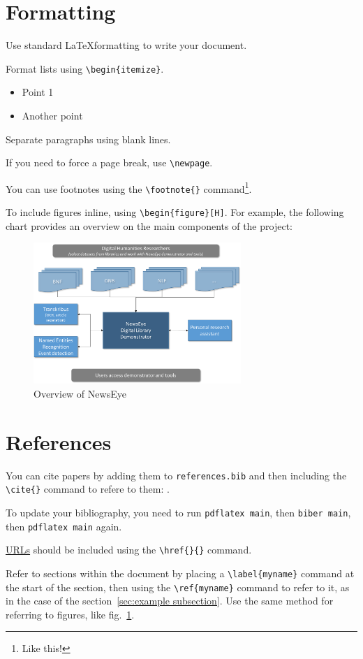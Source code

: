 \documentclass{newseye_del}
\begin{document}
\section{Formatting}
Use standard \LaTeX formatting to write your document.

Format lists using \verb.\begin{itemize}..
\begin{itemize}
    \item Point 1
		\item Another point
\end{itemize}

Separate paragraphs using blank lines.

If you need to force a page break, use \verb.\newpage..

You can use footnotes using the \verb.\footnote{}. command\footnote{%
	Like this!
}.

\newpage

To include figures inline, using \verb.\begin{figure}[H]..
For example, the following chart provides an overview on the main components of the project:

\begin{figure}[H]
	\centering
	\includegraphics[width=0.7\textwidth]{overviewNewsEye.png}

	\caption{Overview of NewsEye}
	\label{fig:place}
\end{figure}



\section{References}
You can cite papers by adding them to \texttt{references.bib}
and then including the \verb.\cite{}. command to refere to them:
\cite{Crane2017}.

To update your bibliography, you need to run \texttt{pdflatex main},
then \texttt{biber main}, then \texttt{pdflatex main} again.


\href{https://www.newseye.eu/}{URLs} should be included using the \verb.\href{}{}. command.

Refer to sections within the document by placing a \verb.\label{myname}.
command at the start of the section, then using the \verb.\ref{myname}.
command to refer to it, as in the case of the
section~\ref{sec:example subsection}. Use the same method for referring
to figures, like fig.~\ref{fig:place}.



\newpage
\printbibliography
\end{document}

